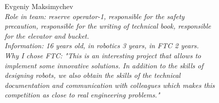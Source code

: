 \begin{figure}[H]
	\begin{minipage}{0.47\linewidth}
		Evgeniy Maksimychev\\
		\emph{Role in team: reserve operator-1, responsible for the safety precaution, responsible for the writing of technical book, responsible for the elevator and bucket. \\}
		\emph{Information: 16 years old, in robotics 3 years, in FTC 2 years. \\}
		\emph{Why I chose FTC: "This is an interesting project that allows to implement some innovative solutions. In addition to the skills of designing robots, we also obtain the skills of the technical documentation and communication with colleagues which makes this competition as close to real engineering problems."}			
	\end{minipage}
	\hfill
	\begin{minipage}{0.47\linewidth}
		\\
	\end{minipage}	
\end{figure}

\fillpage


